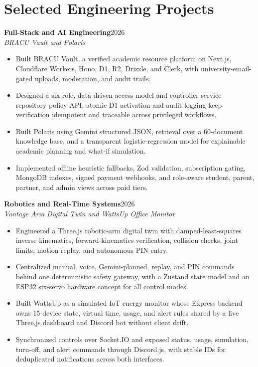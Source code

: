 \documentclass[10pt,a4paper]{article}
\newcommand{\entry}[3]{%
  \textbf{#1}\hfill {\color{gray}#3}\\[-0.08em]
  \textit{#2}\vspace{0.05em}
}
\begin{document}
\section{Selected Engineering Projects}
\entry{Full-Stack and AI Engineering}{BRACU Vault and Polaris}{2026}
\begin{itemize}
  \item Built BRACU Vault, a verified academic resource platform on Next.js, Cloudflare Workers, Hono, D1, R2, Drizzle, and Clerk, with university-email-gated uploads, moderation, and audit trails.
  \item Designed a six-role, data-driven access model and controller-service-repository-policy API; atomic D1 activation and audit logging keep verification idempotent and traceable across privileged workflows.
  \item Built Polaris using Gemini structured JSON, retrieval over a 60-document knowledge base, and a transparent logistic-regression model for explainable academic planning and what-if simulation.
  \item Implemented offline heuristic fallbacks, Zod validation, subscription gating, MongoDB indexes, signed payment webhooks, and role-aware student, parent, partner, and admin views across paid tiers.
\end{itemize}

\entry{Robotics and Real-Time Systems}{Vantage Arm Digital Twin and WattsUp Office Monitor}{2026}
\begin{itemize}
  \item Engineered a Three.js robotic-arm digital twin with damped-least-squares inverse kinematics, forward-kinematics verification, collision checks, joint limits, motion replay, and autonomous PIN entry.
  \item Centralized manual, voice, Gemini-planned, replay, and PIN commands behind one deterministic safety gateway, with a Zustand state model and an ESP32 six-servo hardware concept for all control modes.
  \item Built WattsUp as a simulated IoT energy monitor whose Express backend owns 15-device state, virtual time, usage, and alert rules shared by a live Three.js dashboard and Discord bot without client drift.
  \item Synchronized controls over Socket.IO and exposed status, usage, simulation, turn-off, and alert commands through Discord.js, with stable IDs for deduplicated notifications across both interfaces.
\end{itemize}
\end{document}

